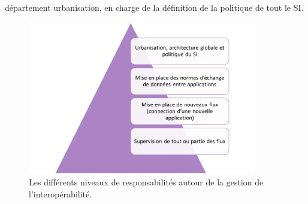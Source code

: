 			département urbanisation, en charge de la définition de la politique de tout le SI.
			\begin{figure}[H]
				\centering
				\includegraphics[width=10cm]{../img/si_1.png}
				\caption{\label{orga_interop} Les différents niveaux de responsabilités
				autour de la gestion de l'interopérabilité.}
			\end{figure}
			
